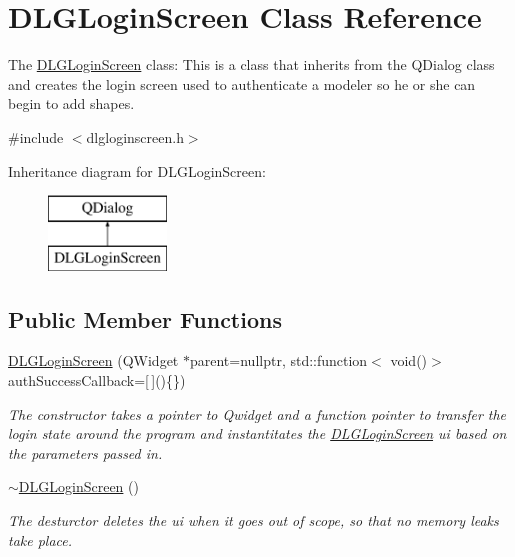 \hypertarget{class_d_l_g_login_screen}{}\section{D\+L\+G\+Login\+Screen Class Reference}
\label{class_d_l_g_login_screen}


The \mbox{\hyperlink{class_d_l_g_login_screen}{D\+L\+G\+Login\+Screen}} class\+: This is a class that inherits from the Q\+Dialog class and creates the login screen used to authenticate a modeler so he or she can begin to add shapes.  




{\ttfamily \#include $<$dlgloginscreen.\+h$>$}

Inheritance diagram for D\+L\+G\+Login\+Screen\+:\begin{figure}[H]
\begin{center}
\leavevmode
\includegraphics[height=2.000000cm]{class_d_l_g_login_screen}
\end{center}
\end{figure}
\subsection*{Public Member Functions}
\begin{DoxyCompactItemize}
\item 
\mbox{\hyperlink{class_d_l_g_login_screen_aabc315a7cca94bcccf1965a5dd2d6dd4}{D\+L\+G\+Login\+Screen}} (Q\+Widget $\ast$parent=nullptr, std\+::function$<$ void()$>$ auth\+Success\+Callback=\mbox{[}$\,$\mbox{]}()\{\})
\begin{DoxyCompactList}\small\item\em The constructor takes a pointer to Qwidget and a function pointer to transfer the login state around the program and instantitates the \mbox{\hyperlink{class_d_l_g_login_screen}{D\+L\+G\+Login\+Screen}} ui based on the parameters passed in. \end{DoxyCompactList}\item 
\mbox{\label{class_d_l_g_login_screen_a3c2f15f994982c0ddbaba8aea9eedf2a}} 
\mbox{\hyperlink{class_d_l_g_login_screen_a3c2f15f994982c0ddbaba8aea9eedf2a}{$\sim$\+D\+L\+G\+Login\+Screen}} ()
\begin{DoxyCompactList}\small\item\em The desturctor deletes the ui when it goes out of scope, so that no memory leaks take place. \end{DoxyCompactList}\end{DoxyCompactItemize}


